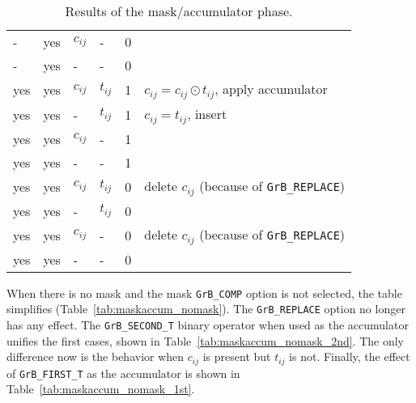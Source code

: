 \documentclass[12pt]{article}
\begin{document}
{\begin{table}
{\begin{tabular}{lllll|l}
    -  &yes & $c_{ij}$ &  -        & 0    &   \\
    -  &yes &  -       &  -        & 0    &   \\
\hline
    yes&yes & $c_{ij}$ & $t_{ij}$  & 1    &  $c_{ij} = c_{ij} \odot t_{ij}$, apply accumulator \\
    yes&yes &  -       & $t_{ij}$  & 1    &  $c_{ij} = t_{ij}$, insert \\
    yes&yes & $c_{ij}$ &  -        & 1    &   \\
    yes&yes &  -       &  -        & 1    &   \\
    yes&yes & $c_{ij}$ & $t_{ij}$  & 0    &  delete $c_{ij}$  (because of \verb'GrB_REPLACE') \\
    yes&yes &  -       & $t_{ij}$  & 0    &   \\
    yes&yes & $c_{ij}$ &  -        & 0    &  delete $c_{ij}$  (because of \verb'GrB_REPLACE') \\
    yes&yes &  -       &  -        & 0    &   \\
\hline
\end{tabular}
}
\caption{Results of the mask/accumulator phase. \label{tab:maskaccum}}
\end{table}

When there is no mask and the mask \verb'GrB_COMP' option is not selected, the
table simplifies (Table~\ref{tab:maskaccum_nomask}).  The \verb'GrB_REPLACE'
option no longer has any effect.  The \verb'GrB_SECOND_T' binary operator when
used as the accumulator unifies the first cases, shown in
Table~\ref{tab:maskaccum_nomask_2nd}.  The only difference now is the behavior
when $c_{ij}$ is present but $t_{ij}$ is not.  Finally, the effect of
\verb'GrB_FIRST_T' as the accumulator is shown in
Table~\ref{tab:maskaccum_nomask_1st}. 

}
\end{document}
